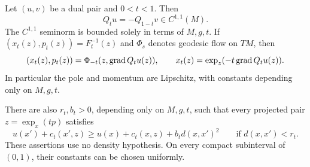 \begin{proposition}
\label{geo:intermediate}
Let $(u,v)$ be a dual pair and $0<t<1$.  Then
\begin{equation}
 \label{geo:intermediate-duality}
 Q_tu=-Q_{1-t}v\in C^{1,1}(M).
\end{equation}
The $C^{1,1}$ seminorm is bounded solely in terms of $M,g,t$.
If $(x_t(z),p_t(z))=F_t^{-1}(z)$ and $\Phi_s$ denotes geodesic
flow on $TM$, then
\begin{equation}
 \label{geo:pole-flow}
 (x_t(z),p_t(z))
   =\Phi_{-t}(z,\operatorname{grad} Q_tu(z)),
 \qquad
 x_t(z)=\exp_z(-t\operatorname{grad} Q_tu(z)).
\end{equation}
In particular the pole and momentum are Lipschitz, with constants
depending only on $M,g,t$.

There are also $r_t,b_t>0$, depending only on $M,g,t$, such that
every projected pair $z=\exp_x(tp)$ satisfies
\begin{equation}
 \label{geo:uniform-growth}
 u(x')+c_t(x',z)
 \geq u(x)+c_t(x,z)+b_t d(x,x')^2
 \qquad\text{if }d(x,x')<r_t.
\end{equation}
These assertions use no density hypothesis.  On every compact
subinterval of $(0,1)$, their constants can be chosen uniformly.
\end{proposition}

